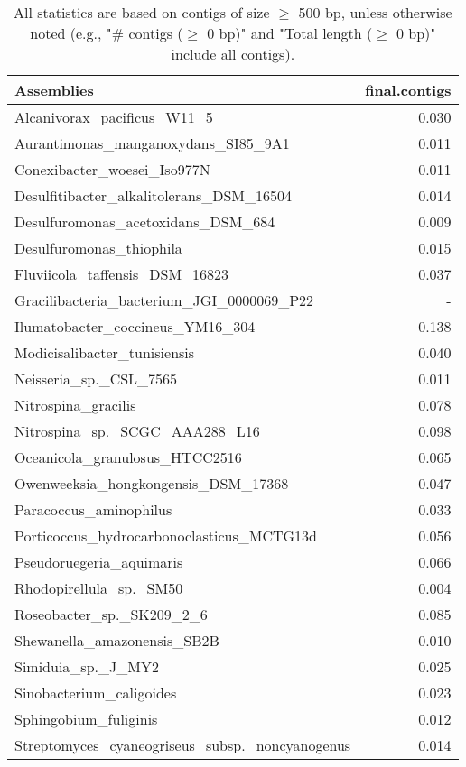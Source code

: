 \documentclass[12pt,a4paper]{article}
\begin{document}
\begin{table}[ht]
\begin{center}
\caption{All statistics are based on contigs of size $\geq$ 500 bp, unless otherwise noted (e.g., "\# contigs ($\geq$ 0 bp)" and "Total length ($\geq$ 0 bp)" include all contigs).}
\begin{tabular}{|l*{1}{|r}|}
\hline
Assemblies & final.contigs \\ \hline
Alcanivorax\_pacificus\_W11\_5 & 0.030 \\ \hline
Aurantimonas\_manganoxydans\_SI85\_9A1 & 0.011 \\ \hline
Conexibacter\_woesei\_Iso977N & 0.011 \\ \hline
Desulfitibacter\_alkalitolerans\_DSM\_16504 & 0.014 \\ \hline
Desulfuromonas\_acetoxidans\_DSM\_684 & 0.009 \\ \hline
Desulfuromonas\_thiophila & 0.015 \\ \hline
Fluviicola\_taffensis\_DSM\_16823 & 0.037 \\ \hline
Gracilibacteria\_bacterium\_JGI\_0000069\_P22 & - \\ \hline
Ilumatobacter\_coccineus\_YM16\_304 & 0.138 \\ \hline
Modicisalibacter\_tunisiensis & 0.040 \\ \hline
Neisseria\_sp.\_CSL\_7565 & 0.011 \\ \hline
Nitrospina\_gracilis & 0.078 \\ \hline
Nitrospina\_sp.\_SCGC\_AAA288\_L16 & 0.098 \\ \hline
Oceanicola\_granulosus\_HTCC2516 & 0.065 \\ \hline
Owenweeksia\_hongkongensis\_DSM\_17368 & 0.047 \\ \hline
Paracoccus\_aminophilus & 0.033 \\ \hline
Porticoccus\_hydrocarbonoclasticus\_MCTG13d & 0.056 \\ \hline
Pseudoruegeria\_aquimaris & 0.066 \\ \hline
Rhodopirellula\_sp.\_SM50 & 0.004 \\ \hline
Roseobacter\_sp.\_SK209\_2\_6 & 0.085 \\ \hline
Shewanella\_amazonensis\_SB2B & 0.010 \\ \hline
Simiduia\_sp.\_J\_MY2 & 0.025 \\ \hline
Sinobacterium\_caligoides & 0.023 \\ \hline
Sphingobium\_fuliginis & 0.012 \\ \hline
Streptomyces\_cyaneogriseus\_subsp.\_noncyanogenus & 0.014 \\ \hline

\end{tabular}
\end{center}
\end{table}
\end{document}
